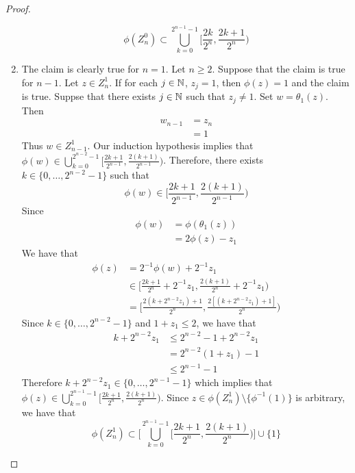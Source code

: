 \documentclass{book}
\begin{document}
\begin{proof}
\begin{enumerate}
			$$\phi(Z_n^0) \subset \bigcup\limits_{k =0}^{2^{n-1} - 1} \bigg[ \frac{2k}{2^n}, \frac{2k+1}{2^n} \bigg)$$
			\item The claim is clearly true for $n =1$. Let $n \geq 2$. Suppose that the claim is true for $n-1$. Let $z \in Z_n^1$. If for each $j \in \mathbb{N}$, $z_j = 1$, then $\phi(z) = 1$ and the claim is true. Suppse that there exists $j \in \mathbb{N}$ such that $z_j \neq 1$. Set $w = \theta_1(z)$. Then 
			\begin{align*}
				w_{n-1} 
				& = z_n \\
				& = 1
			\end{align*} 
			Thus $w \in Z_{n-1}^1$. Our induction hypothesis implies that $\phi(w) \in \bigcup\limits_{k =0}^{2^{n-2} -1} \bigg[ \frac{2k+1}{2^{n-1}}, \frac{2(k+1)}{2^{n-1}} \bigg)$. Therefore, there exists $k \in \{0, \ldots, 2^{n-2} -1\}$ such that $$\phi(w) \in \bigg[ \frac{2k+1}{2^{n-1}}, \frac{2(k+1)}{2^{n-1}} \bigg)$$ Since 
			\begin{align*}
				\phi(w) 
				& = \phi(\theta_1(z)) \\
				& = 2 \phi(z) - z_1
			\end{align*}
			We have that
			\begin{align*}
				\phi(z) 
				& = 2^{-1}\phi(w) + 2^{-1} z_1 \\
				& \in \bigg[ \frac{2k+1}{2^n} + 2^{-1}z_1, \frac{2(k + 1)}{2^n} +  2^{-1}z_1 \bigg) \\
				& = \bigg[ \frac{2(k+ 2^{n-2}z_1) + 1}{2^n}, \frac{2[(k+ 2^{n-2}z_1) + 1]}{2^n} \bigg) 
			\end{align*}
			Since $k \in \{0, \ldots, 2^{n-2} -1\}$ and $1 + z_1 \leq 2$, we have that 
			\begin{align*}
				k+ 2^{n-2}z_1 
				& \leq 2^{n-2} -1 + 2^{n-2}z_1  \\
				&  =  2^{n-2}(1 + z_1) - 1 \\
				& \leq 2^{n-1} - 1
			\end{align*} 
			Therefore $	k+ 2^{n-2}z_1 \in \{0, \ldots, 2^{n-1} - 1\}$ which implies that $\phi(z) \in  \bigcup\limits_{k =0}^{2^{n-1} -1} \bigg[ \frac{2k+1}{2^n}, \frac{2(k+1)}{2^n} \bigg)$. Since $z \in \phi(Z_n^1) \setminus \{\phi^{-1}(1)\}$ is arbitrary, we have that
			$$\phi(Z_n^1 ) \subset \bigg[ \bigcup\limits_{k =0}^{2^{n-1} -1} \bigg[ \frac{2k + 1}{2^n}, \frac{2(k+1)}{2^n} \bigg) \bigg] \cup \{1\}$$
		\end{enumerate}
	\end{proof}
	
	
	
\end{document}
